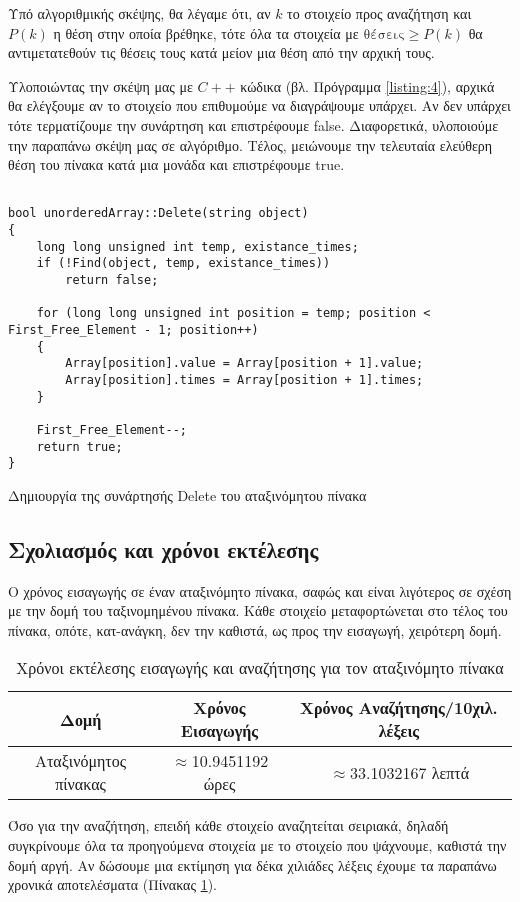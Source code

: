 Υπό αλγοριθμικής σκέψης, θα λέγαμε ότι, αν $k$ το στοιχείο προς αναζήτηση και $P(k)$ η θέση στην οποία βρέθηκε, τότε όλα τα στοιχεία με $ \mbox{θέσεις} \geq P(k)$ θα αντιμετατεθούν τις θέσεις τους κατά μείον μια θέση από την αρχική τους.

Υλοποιώντας την σκέψη μας με $C++$ κώδικα (βλ. Πρόγραμμα \ref{listing:4}), αρχικά θα ελέγξουμε αν το στοιχείο που επιθυμούμε να διαγράψουμε υπάρχει. Αν δεν υπάρχει τότε τερματίζουμε την συνάρτηση και επιστρέφουμε \en false\gr. Διαφορετικά, υλοποιούμε την παραπάνω σκέψη μας σε αλγόριθμο. Τέλος, μειώνουμε την τελευταία ελεύθερη θέση του πίνακα κατά μια μονάδα και επιστρέφουμε \en true\gr.

\en
\begin{listing}[ht]
\begin{verbatim}

bool unorderedArray::Delete(string object)
{
    long long unsigned int temp, existance_times;
    if (!Find(object, temp, existance_times))
        return false;

    for (long long unsigned int position = temp; position < First_Free_Element - 1; position++)
    {
        Array[position].value = Array[position + 1].value;
        Array[position].times = Array[position + 1].times;
    }

    First_Free_Element--;
    return true;
}

\end{verbatim}
\caption{Δημιουργία της συνάρτησής Delete του αταξινόμητου πίνακα}
\label{listing:4}
\end{listing}

\subsection{Σχολιασμός και χρόνοι εκτέλεσης}

Ο χρόνος εισαγωγής σε έναν αταξινόμητο πίνακα, σαφώς και είναι λιγότερος σε σχέση με την δομή του ταξινομημένου πίνακα. Κάθε στοιχείο μεταφορτώνεται στο τέλος του πίνακα, οπότε, κατ-ανάγκη, δεν την καθιστά, ως προς την εισαγωγή, χειρότερη δομή.

\gr
\begin{table}[!ht]
\centering
\begin{tabular}{||c c c||} 
 \hline
 Δομή  & Χρόνος Εισαγωγής & Χρόνος Αναζήτησης/10χιλ. λέξεις \\
 \hline\hline
 Αταξινόμητος πίνακας & $\approx$10.9451192 ώρες & $\approx$33.1032167 λεπτά \\
 \hline
\end{tabular}
\caption{Χρόνοι εκτέλεσης εισαγωγής και αναζήτησης για τον αταξινόμητο πίνακα}
\label{table:3}
\end{table}

Όσο για την αναζήτηση, επειδή κάθε στοιχείο αναζητείται σειριακά, δηλαδή συγκρίνουμε όλα τα προηγούμενα στοιχεία με το στοιχείο που ψάχνουμε, καθιστά την δομή αργή. Αν δώσουμε μια εκτίμηση για δέκα χιλιάδες λέξεις έχουμε τα παραπάνω χρονικά αποτελέσματα (Πίνακας \ref{table:3}).